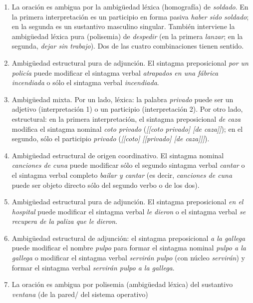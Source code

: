 \begin{enumerate}
\begin{enumerate}
\item La oración es ambigua por la ambigüedad léxica (homografía) de \emph{soldado}. En la primera interpretación es un participio en forma pasiva \emph{haber sido soldado}; en la segunda es un sustantivo masculino singular. También interviene la ambigüedad léxica pura (polisemia) de \emph{despedir} (en la primera \emph{lanzar}; en la segunda, \emph{dejar sin trabajo}). Dos de las cuatro combinaciones tienen sentido. \item Ambigüedad estructural pura de adjunción. El sintagma preposicional \emph{por un policía} puede modificar el sintagma verbal \emph{atrapados en una fábrica incendiada} o sólo el sintagma verbal \emph{incendiada}. \item Ambigüedad mixta. Por un lado, léxica: la palabra \emph{privado} puede ser un adjetivo (interpretación 1) o un participio (interpretación 2). Por otro lado, estructural: en la primera interpretación, el sintagma preposicional \emph{de caza} modifica el sintagma nominal \emph{coto privado} (\emph{[[coto privado] [de caza]]}); en el segundo, sólo el participio \emph{privado} (\emph{[[coto] [[privado] [de caza]]]}). \item Ambigüedad estructural de origen coordinativo. El sintagma nominal \emph{canciones de cuna} puede modificar sólo el segundo sintagma verbal \emph{cantar} o el sintagma verbal completo \emph{bailar y cantar} (es decir, \emph{canciones de cuna} puede ser objeto directo sólo del segundo verbo o de los dos). \item Ambigüedad estructural pura de adjunción. El sintagma preposicional \emph{en el hospital} puede modificar el sintagma verbal \emph{le dieron} o el sintagma verbal \emph{se recupera de la paliza que le dieron}. \item Ambigüedad estructural de adjunción: el sintagma preposicional \emph{a la gallega} puede modificar el nombre \emph{pulpo} para formar el sintagma nominal \emph{pulpo a la gallega} o modificar el sintagma verbal \emph{servirán pulpo} (con núcleo \emph{servirán}) y formar el sintagma verbal \emph{servirán pulpo a la gallega}. \item La oración es ambigua por polisemia (ambigüedad léxica) del sustantivo \emph{ventana} (de la pared/ del sistema operativo) 


\end{enumerate}
\end{enumerate}
